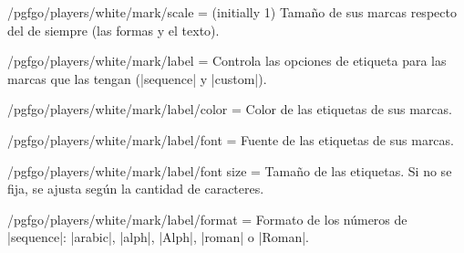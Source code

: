 \begin{goban}[9, stone = {radius = 4pt}, mark = {line = {color = red}}]
\begin{key}{/pgfgo/players/white/mark/scale =  (initially 1)}
	Tamaño de sus marcas respecto del de siempre (las formas y el texto).

	\begin{codeexample}[width=4cm]

		\begin{goban}[3]
		\end{goban}
	\end{codeexample}
\end{key}

\begin{key}{/pgfgo/players/white/mark/label = }
	Controla las opciones de etiqueta para las marcas que las tengan (|sequence| y |custom|).

	\begin{codeexample}[width=4cm]

		\begin{goban}[3]
		\end{goban}
	\end{codeexample}
\end{key}

\begin{key}{/pgfgo/players/white/mark/label/color = }
	Color de las etiquetas de sus marcas.
\end{key}

\begin{key}{/pgfgo/players/white/mark/label/font = }
	Fuente de las etiquetas de sus marcas.
\end{key}

\begin{key}{/pgfgo/players/white/mark/label/font size = }
	Tamaño de las etiquetas. Si no se fija, se ajusta según la cantidad de caracteres.
\end{key}

\begin{key}{/pgfgo/players/white/mark/label/format = }
	Formato de los números de |sequence|: |arabic|, |alph|, |Alph|, |roman| o |Roman|.
\end{key}


\end{goban}
